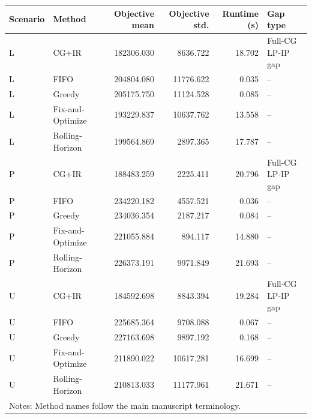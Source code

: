 \begin{tabular}{llrrrl}
\toprule
Scenario & Method & Objective mean & Objective std. & Runtime (s) & Gap type \\
\midrule
L & CG+IR & 182306.030 & 8636.722 & 18.702 & Full-CG LP-IP gap \\
L & FIFO & 204804.080 & 11776.622 & 0.035 & -- \\
L & Greedy & 205175.750 & 11124.528 & 0.085 & -- \\
L & Fix-and-Optimize & 193229.837 & 10637.762 & 13.558 & -- \\
L & Rolling-Horizon & 199564.869 & 2897.365 & 17.787 & -- \\
P & CG+IR & 188483.259 & 2225.411 & 20.796 & Full-CG LP-IP gap \\
P & FIFO & 234220.182 & 4557.521 & 0.036 & -- \\
P & Greedy & 234036.354 & 2187.217 & 0.084 & -- \\
P & Fix-and-Optimize & 221055.884 & 894.117 & 14.880 & -- \\
P & Rolling-Horizon & 226373.191 & 9971.849 & 21.693 & -- \\
U & CG+IR & 184592.698 & 8843.394 & 19.284 & Full-CG LP-IP gap \\
U & FIFO & 225685.364 & 9708.088 & 0.067 & -- \\
U & Greedy & 227163.698 & 9897.192 & 0.168 & -- \\
U & Fix-and-Optimize & 211890.022 & 10617.281 & 16.699 & -- \\
U & Rolling-Horizon & 210813.033 & 11177.961 & 21.671 & -- \\
\multicolumn{6}{p{0.98\linewidth}}{\footnotesize Notes: Method names follow the main manuscript terminology.}\\
\bottomrule
\end{tabular}
